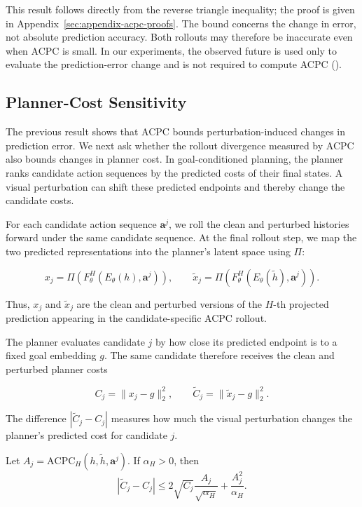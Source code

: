 This result follows directly from the reverse triangle inequality; the proof
is given in Appendix~\ref{sec:appendix-acpc-proofs}. The bound concerns the
change in error, not absolute prediction accuracy. Both
rollouts may therefore be inaccurate even when ACPC is small. In our
experiments, the observed future is used only to evaluate the prediction-error
change and is not required to compute ACPC
().


\subsection{Planner-Cost Sensitivity}

The previous result shows that ACPC bounds perturbation-induced changes in
prediction error. We next ask whether the rollout divergence measured by ACPC
also bounds changes in planner cost. In goal-conditioned planning, the
planner ranks candidate action sequences by the predicted costs of their final
states. A visual perturbation can shift these predicted endpoints and thereby
change the candidate costs.

For each candidate action sequence $\mathbf a^j$, we roll the clean and
perturbed histories forward under the same candidate sequence. At the final
rollout step, we map the two predicted representations into the planner's
latent space using $\Pi$:

$$
x_j=\Pi(F_\theta^H(E_\theta(h),\mathbf a^j)),
\qquad
\tilde x_j=\Pi(F_\theta^H(E_\theta(\tilde h),\mathbf a^j)).
$$

Thus, $x_j$ and $\tilde x_j$ are the clean and perturbed versions of the
$H$-th projected prediction appearing in the candidate-specific ACPC rollout.

The planner evaluates candidate $j$ by how close its predicted endpoint is to
a fixed goal embedding $g$. The same candidate therefore receives the clean
and perturbed planner costs

$$
C_j=\|x_j-g\|_2^2,
\qquad
\tilde C_j=\|\tilde x_j-g\|_2^2.
$$

The difference $|\tilde C_j-C_j|$ measures how much the visual perturbation
changes the planner's predicted cost for candidate $j$.

\begin{proposition}
\label{prop:exact-cost-certificate}
Let $A_j=\mathrm{ACPC}_H(h,\tilde h,\mathbf a^j)$. If $\alpha_H>0$, then
\begin{equation}
|\tilde C_j-C_j|
\leq
2\sqrt{C_j}\frac{A_j}{\sqrt{\alpha_H}}
+\frac{A_j^2}{\alpha_H}.
\label{eq:exact-cost-bound}
\end{equation}
\end{proposition}

